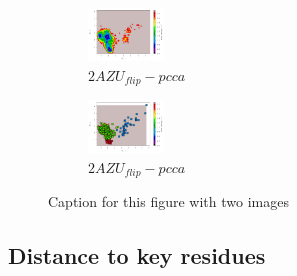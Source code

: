 \documentclass[fleqn,10pt]{wlscirep}
\begin{document}
\begin{figure}[!ht]
\centering
\begin{subfigure}{.5\textwidth}
  \centering
  \includegraphics[width=.9\linewidth]{2AZU_flip/2AZU_flip-tica.pdf}
  \caption{$2AZU_{flip}-pcca$}
  \label{sup:2AZU_flip-tica}
\end{subfigure}%
\begin{subfigure}{.5\textwidth}
  \centering
  \includegraphics[width=.9\linewidth]{2AZU_flip/2AZU_flip-pcca.pdf}
  \caption{$2AZU_{flip}-pcca$}
  \label{sup:2AZU_flip-pcca}
\end{subfigure}
\caption{Caption for this figure with two images}
\label{sup:2AZU_flip-cluster}
\end{figure}


\subsection{Distance to key residues}
\end{document}
